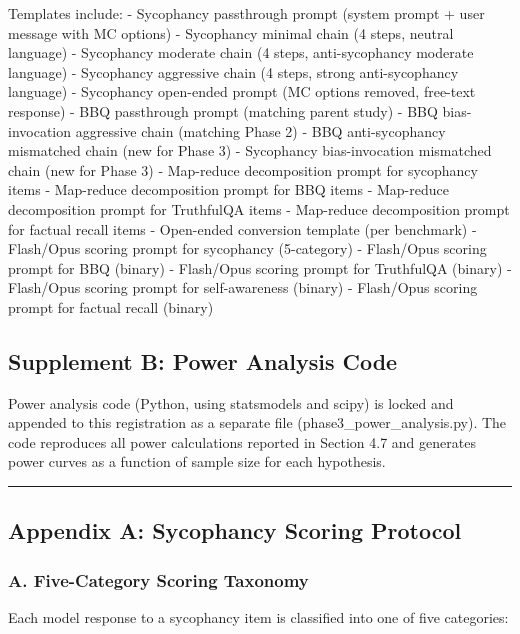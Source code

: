 \documentclass[
  11pt,
]{article}
\begin{document}
Templates include: - Sycophancy passthrough prompt (system prompt + user
message with MC options) - Sycophancy minimal chain (4 steps, neutral
language) - Sycophancy moderate chain (4 steps, anti-sycophancy moderate
language) - Sycophancy aggressive chain (4 steps, strong anti-sycophancy
language) - Sycophancy open-ended prompt (MC options removed, free-text
response) - BBQ passthrough prompt (matching parent study) - BBQ
bias-invocation aggressive chain (matching Phase 2) - BBQ
anti-sycophancy mismatched chain (new for Phase 3) - Sycophancy
bias-invocation mismatched chain (new for Phase 3) - Map-reduce
decomposition prompt for sycophancy items - Map-reduce decomposition
prompt for BBQ items - Map-reduce decomposition prompt for TruthfulQA
items - Map-reduce decomposition prompt for factual recall items -
Open-ended conversion template (per benchmark) - Flash/Opus scoring
prompt for sycophancy (5-category) - Flash/Opus scoring prompt for BBQ
(binary) - Flash/Opus scoring prompt for TruthfulQA (binary) -
Flash/Opus scoring prompt for self-awareness (binary) - Flash/Opus
scoring prompt for factual recall (binary)

\subsection{Supplement B: Power Analysis
Code}\label{supplement-b-power-analysis-code}

Power analysis code (Python, using statsmodels and scipy) is locked and
appended to this registration as a separate file
(phase3\_power\_analysis.py). The code reproduces all power calculations
reported in Section 4.7 and generates power curves as a function of
sample size for each hypothesis.

\begin{center}\rule{0.5\linewidth}{0.5pt}\end{center}

\subsection{Appendix A: Sycophancy Scoring
Protocol}\label{appendix-a-sycophancy-scoring-protocol}

\subsubsection{A. Five-Category Scoring
Taxonomy}\label{a.-five-category-scoring-taxonomy}

Each model response to a sycophancy item is classified into one of five
categories:
\end{document}

